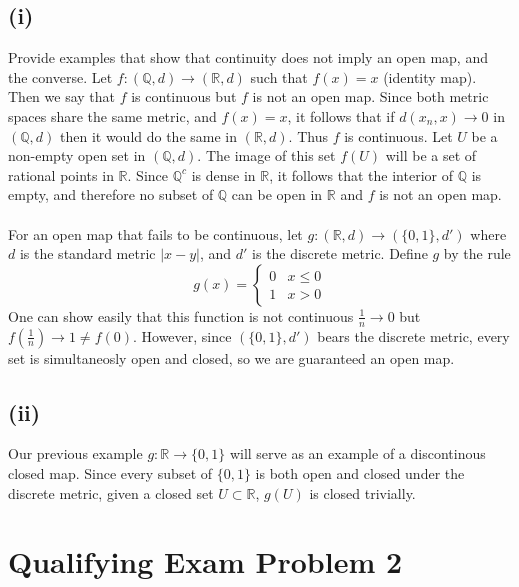 \documentclass{article}
\begin{document}
    \subsection*{(i)}
        Provide examples that show that continuity does not imply an open map, and the converse. Let
        $f: (\mathbb{Q},d) \rightarrow (\mathbb{R},d)$ such that $f(x) = x$ (identity map). Then we say
        that $f$ is continuous but $f$ is not an open map. Since both metric spaces share the same metric,
        and $f(x) = x$, it follows that if $d(x_n,x) \rightarrow 0$ in $(\mathbb{Q}, d)$ then it would do the
        same in $(\mathbb{R}, d)$. Thus $f$ is continuous. Let $U$ be a non-empty open set in $(\mathbb{Q}, d)$.
        The image of this set $f(U)$ will be a set of rational points in $\mathbb{R}$. Since $\mathbb{Q}^c$ is 
        dense in $\mathbb{R}$, it follows that the interior of $\mathbb{Q}$ is empty, and therefore no subset
        of $\mathbb{Q}$ can be open in $\mathbb{R}$ and $f$ is not an open map.\\\\
        For an open map that fails to be continuous, let $g: (\mathbb{R},d) \rightarrow (\{0,1\},d')$ where
        $d$ is the standard metric $|x - y|$, and $d'$ is the discrete metric. Define $g$ by the rule
        \[
            g(x) =
            \begin{cases}
                0 & x \leq 0\\
                1 & x > 0
            \end{cases}
        \]
        One can show easily that this function is not continuous $\frac{1}{n} \rightarrow 0$ but $f(\frac{1}{n}) \rightarrow 1 \neq f(0)$.
        However, since $(\{0,1\}, d')$ bears the discrete metric, every set is simultaneosly open and closed, so we are
        guaranteed an open map.
    \subsection*{(ii)}
        Our previous example $g:\mathbb{R} \rightarrow \{0,1\}$ will serve as an example of a discontinous closed map.
        Since every subset of $\{0,1\}$ is both open and closed under the discrete metric, given a closed set $U \subset \mathbb{R}$,
         $g(U)$ is closed trivially.
\section*{Qualifying Exam Problem 2}
\end{document}
